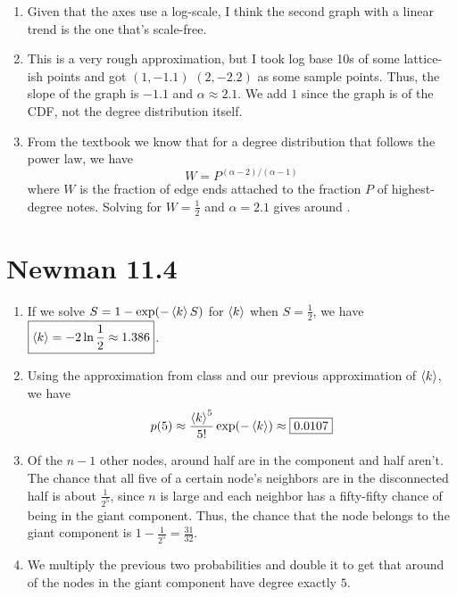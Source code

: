 \documentclass[12pt]{article}
\begin{document}
\begin{enumerate}
      \item Given that the axes use a log-scale, I think the second graph
            with a linear trend is the one that's scale-free.

      \item This is a very rough approximation, but I took log base 10s
            of some lattice-ish points and got $(1, -1.1)$ $(2, -2.2)$ as some sample points.
            Thus, the slope of the graph is $-1.1$ and $\boxed{\alpha \approx 2.1}$.
            We add $1$ since the graph is of the CDF, not the degree distribution itself.

      \item From the textbook we know that for a degree distribution
            that follows the power law, we have
            \[W=P^{(\alpha-2)/(\alpha-1)}\]
            where $W$ is the fraction of edge ends attached
            to the fraction $P$ of highest-degree notes.
            Solving for $W=\frac{1}{2}$ and $\alpha=2.1$ gives around .
\end{enumerate}

\section{Newman 11.4}

\begin{enumerate}
      \item If we solve $S=1-\exp(-\braket{k}S)$ for $\braket{k}$ when $S=\frac{1}{2}$,
            we have $\boxed{\braket{k}=-2\ln \frac{1}{2} \approx 1.386}$.

      \item Using the approximation from class and our previous approximation of $\braket{k}$, we have
            \[p(5) \approx \frac{\braket{k}^5}{5!}\exp(-\braket{k}) \approx \boxed{0.0107}\]

      \item Of the $n-1$ other nodes, around half are in the component and half aren't.
            The chance that all five of a certain node's neighbors are in the disconnected half
            is about $\frac{1}{2^5}$, since $n$ is large
            and each neighbor has a fifty-fifty chance of being in the giant component.
            Thus, the chance that the node belongs to the giant component
            is $1-\frac{1}{2^5}=\boxed{\frac{31}{32}}$.

      \item We multiply the previous two probabilities
            and double it to get that around  of the nodes in the giant
            component have degree exactly $5$.
\end{enumerate}
\end{document}
